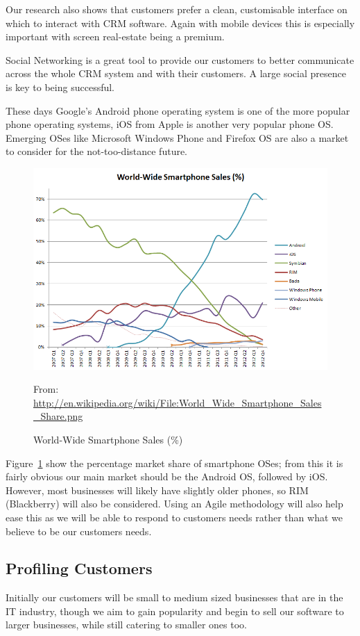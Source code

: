 \documentclass[DIV=calc, paper=a4, fontsize=11pt]{scrartcl}	 %
\begin{document}
Our research also shows that customers prefer a clean, customisable interface on which to interact
with CRM software. Again with mobile devices this is especially important with screen real-estate
being a premium.

Social Networking is a great tool to provide our customers to better communicate across the whole
CRM system and with their customers. A large social presence is key to being successful.

These days Google's Android phone operating system is one of the more popular phone operating systems,
iOS from Apple is another very popular phone OS. Emerging OSes like Microsoft Windows Phone and 
Firefox OS are also a market to consider for the not-too-distance future.

\begin{figure}[h]
\centering
\includegraphics[scale=0.5]{smartphone-sales.png}

From: \url{http://en.wikipedia.org/wiki/File:World_Wide_Smartphone_Sales_Share.png}
\caption{World-Wide Smartphone Sales (\%)} \label{sales}
\end{figure}

Figure~\ref{sales} show the percentage market share of smartphone OSes; from this it is fairly
obvious our main market should be the Android OS, followed by iOS. However, most businesses will
likely have slightly older phones, so RIM (Blackberry) will also be considered. Using an Agile
methodology will also help ease this as we will be able to respond to customers needs rather than
what we believe to be our customers needs.

\subsection{Profiling Customers}
Initially our customers will be small to medium sized businesses that are in the IT industry, 
though we aim to gain popularity and begin to sell our software to larger businesses, while still
catering to smaller ones too.
\end{document}
